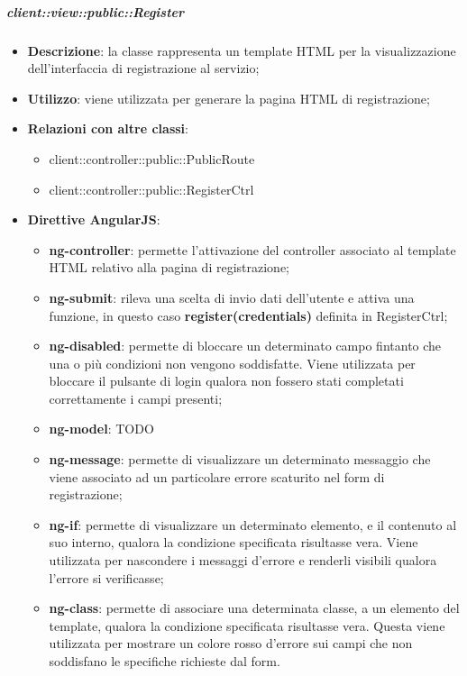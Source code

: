 		\subparagraph{client::view::public::Register} %
		\label{subp:bdsm_app_client_view_public_register}
			\begin{itemize}
				\item \textbf{Descrizione}: la classe rappresenta un template HTML per la visualizzazione dell'interfaccia di registrazione al servizio;
				\item \textbf{Utilizzo}: viene utilizzata per generare la pagina HTML di registrazione;
				\item \textbf{Relazioni con altre classi}:
					\begin{itemize}
						\item client::controller::public::PublicRoute
						\item client::controller::public::RegisterCtrl
					\end{itemize}
				\item \textbf{Direttive AngularJS}:
					\begin{itemize}
						\item \textbf{ng-controller}: permette l'attivazione del controller associato al template HTML relativo alla pagina di registrazione;
						\item \textbf{ng-submit}: rileva una scelta di invio dati dell'utente e attiva una funzione, in questo caso \textbf{register(credentials)} definita in RegisterCtrl;
						\item \textbf{ng-disabled}: permette di bloccare un determinato campo fintanto che una o più condizioni non vengono soddisfatte. Viene utilizzata per bloccare il pulsante di login qualora non fossero stati completati correttamente i campi presenti;
						\item \textbf{ng-model}: TODO
						\item \textbf{ng-message}: permette di visualizzare un determinato messaggio che viene associato ad un particolare errore scaturito nel form di registrazione;
						\item \textbf{ng-if}: permette di visualizzare un determinato elemento, e il contenuto al suo interno, qualora la condizione specificata risultasse vera. Viene utilizzata per nascondere i messaggi d'errore e renderli visibili qualora l'errore si verificasse;
						\item \textbf{ng-class}: permette di associare una determinata classe, a un elemento del template, qualora la condizione specificata risultasse vera. Questa viene utilizzata per mostrare un colore rosso d'errore sui campi che non soddisfano le specifiche richieste dal form.
					\end{itemize}
			\end{itemize}

